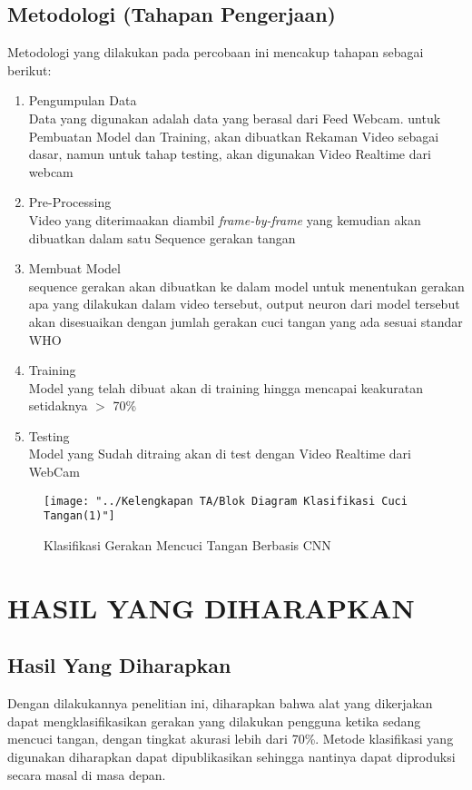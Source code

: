 \documentclass[a4paper]{article}
\begin{document}
		\subsection{Metodologi (Tahapan Pengerjaan)}
			Metodologi yang dilakukan pada percobaan ini mencakup tahapan sebagai berikut:
			\begin{enumerate}
				\item Pengumpulan Data\\
				Data yang digunakan adalah data yang berasal dari Feed Webcam.
				untuk Pembuatan Model dan Training, akan dibuatkan Rekaman Video sebagai dasar, namun untuk tahap testing, akan digunakan Video Realtime dari webcam
				\item Pre-Processing\\
				Video yang diterimaakan diambil \textit{frame-by-frame} yang kemudian akan dibuatkan dalam satu Sequence gerakan tangan
				\item Membuat Model\\
				sequence gerakan akan dibuatkan ke dalam model untuk menentukan gerakan apa yang dilakukan dalam video tersebut, output neuron dari model tersebut akan disesuaikan dengan jumlah gerakan cuci tangan yang ada sesuai standar WHO
				\item Training\\
				Model yang telah dibuat akan di training hingga mencapai keakuratan setidaknya $>$ 70\%
				\item Testing\\
				Model yang Sudah ditraing akan di test dengan Video Realtime dari WebCam
			\end{enumerate}
		
			\begin{figure}[h]
				\centering
				\texttt{[image: "../Kelengkapan TA/Blok Diagram Klasifikasi Cuci Tangan(1)"]}
				\caption[Block Diagram]{Klasifikasi Gerakan Mencuci Tangan Berbasis CNN}
				\label{fig:blok-diagram-klasifikasi-cuci-tangan}
			\end{figure}
			
			
	\newpage
	\section{HASIL YANG DIHARAPKAN}
	
	\subsection{Hasil Yang Diharapkan}	
	\hspace{10mm}Dengan dilakukannya penelitian ini, diharapkan bahwa alat yang dikerjakan dapat mengklasifikasikan gerakan yang dilakukan pengguna ketika sedang mencuci tangan, dengan tingkat akurasi lebih dari 70\%. Metode klasifikasi yang digunakan diharapkan dapat dipublikasikan sehingga nantinya dapat diproduksi secara masal di masa depan.
	
\end{document}
